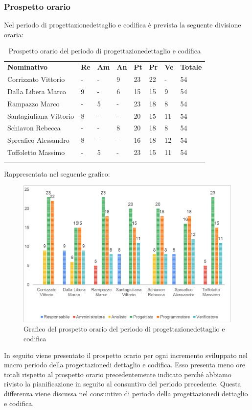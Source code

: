 \subsubsection{Prospetto orario}
Nel periodo di progettazione\glosp dettaglio e codifica è prevista la seguente divisione oraria:
\begin{longtable} {				
		>{}p{40mm}  
		>{}p{8mm}
		>{}p{8mm}
		>{}p{8mm}
		>{}p{8mm}
		>{}p{8mm}
		>{}p{8mm}
		>{}p{12mm}				
	}			
	\rowcolor{gray!50}
	\textbf{Nominativo} & \textbf{Re} & \textbf{Am} & \textbf{An} & \textbf{Pt} & \textbf{Pr} & \textbf{Ve} & \textbf{Totale}	\TBstrut \\ [2mm]
	Corrizzato Vittorio & - & - & 9 & 23 & 22 & - & 54 \TBstrut \\ [2mm]
	Dalla Libera Marco & 9 & - & 6 & 15 & 15 & 9 & 54 \TBstrut \\ [2mm]
	Rampazzo Marco & - & 5 & - & 23 & 18 & 8 & 54 \TBstrut \\ [2mm]
	Santagiuliana Vittorio & 8 & - & - & 20 & 15 & 11 & 54 \TBstrut \\ [2mm]
	Schiavon Rebecca & - & - & 8 & 20 & 18 & 8 & 54 \TBstrut \\ [2mm]
	Spreafico Alessandro & 8 & - & - & 16 & 18 & 12 & 54 \TBstrut \\ [2mm]
	Toffoletto Massimo & - & 5 & - & 23 & 15 & 11 & 54 \TBstrut \\ [2mm]
	\rowcolor{white}
	\caption{Prospetto orario del periodo di progettazione\glosp dettaglio e codifica}
\end{longtable}
\pagebreak
Rappresentata nel seguente grafico:
\begin{figure} [H]
	\includegraphics[width=\linewidth]{./img/Grafici/5.png}
	\caption{Grafico del prospetto orario del periodo di progettazione\glosp dettaglio e codifica}
\end{figure}
\mbox{}
In seguito viene presentato il prospetto orario per ogni incremento sviluppato nel macro periodo della progettazione\glosp di dettaglio e codifica. Esso presenta meno ore totali rispetto al prospetto orario precedentemente indicato perché abbiamo rivisto la pianificazione in seguito al consuntivo del periodo precedente. Questa differenza viene discussa nel consuntivo di periodo della progettazione\glosp di dettaglio e codifica.
